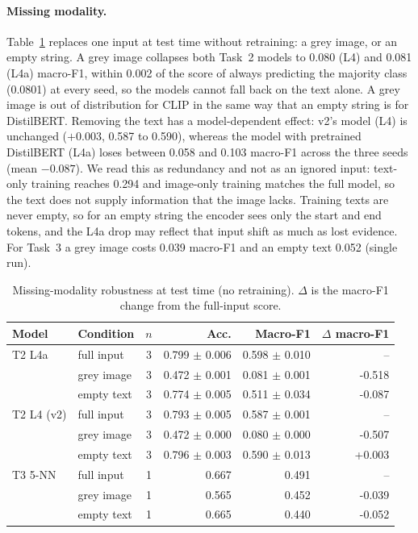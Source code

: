 \paragraph{Missing modality.}
Table~\ref{tab:c1} replaces one input at test time without retraining: a grey image, or an empty string.
A grey image collapses both Task~2 models to 0.080 (L4) and 0.081 (L4a) macro-F1, within 0.002 of the score of always predicting the majority class (0.0801) at every seed, so the models cannot fall back on the text alone.
A grey image is out of distribution for CLIP in the same way that an empty string is for DistilBERT.
Removing the text has a model-dependent effect: v2's model (L4) is unchanged ($+0.003$, 0.587 to 0.590), whereas the model with pretrained DistilBERT (L4a) loses between 0.058 and 0.103 macro-F1 across the three seeds (mean $-0.087$).
We read this as redundancy and not as an ignored input: text-only training reaches 0.294 and image-only training matches the full model, so the text does not supply information that the image lacks.
Training texts are never empty, so for an empty string the encoder sees only the start and end tokens, and the L4a drop may reflect that input shift as much as lost evidence.
For Task~3 a grey image costs 0.039 macro-F1 and an empty text 0.052 (single run).

\begin{table}[t]
\centering
\footnotesize
\caption{Missing-modality robustness at test time (no retraining). $\Delta$ is the macro-F1 change from the full-input score.}
\label{tab:c1}
\begin{tabular}{llcrrr}
\toprule
Model & Condition & $n$ & Acc. & Macro-F1 & $\Delta$ macro-F1 \\
\midrule
T2 L4a & full input & 3 & 0.799 $\pm$ 0.006 & 0.598 $\pm$ 0.010 & -- \\
 & grey image & 3 & 0.472 $\pm$ 0.001 & 0.081 $\pm$ 0.001 & -0.518 \\
 & empty text & 3 & 0.774 $\pm$ 0.005 & 0.511 $\pm$ 0.034 & -0.087 \\
T2 L4 (v2) & full input & 3 & 0.793 $\pm$ 0.005 & 0.587 $\pm$ 0.001 & -- \\
 & grey image & 3 & 0.472 $\pm$ 0.000 & 0.080 $\pm$ 0.000 & -0.507 \\
 & empty text & 3 & 0.796 $\pm$ 0.003 & 0.590 $\pm$ 0.013 & +0.003 \\
T3 5-NN & full input & 1 & 0.667 & 0.491 & -- \\
 & grey image & 1 & 0.565 & 0.452 & -0.039 \\
 & empty text & 1 & 0.665 & 0.440 & -0.052 \\
\bottomrule
\end{tabular}
\end{table}

